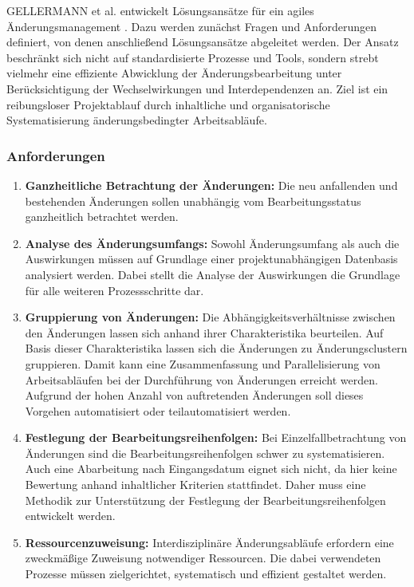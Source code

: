 GELLERMANN et al. entwickelt Lösungsansätze für ein agiles Änderungsmanagement \autocite{Gellermann2017}. Dazu werden zunächst Fragen und Anforderungen definiert, von denen anschließend Lösungsansätze abgeleitet werden. Der Ansatz beschränkt sich nicht auf standardisierte Prozesse und Tools, sondern strebt vielmehr eine effiziente Abwicklung der Änderungsbearbeitung unter Berücksichtigung der Wechselwirkungen und Interdependenzen an.  Ziel ist ein reibungsloser Projektablauf durch inhaltliche und organisatorische Systematisierung änderungsbedingter Arbeitsabläufe. 

\subsubsection*{Anforderungen}

\begin{enumerate}
 \item \textbf{Ganzheitliche Betrachtung der Änderungen: }
Die neu anfallenden und bestehenden Änderungen sollen unabhängig vom Bearbeitungsstatus ganzheitlich betrachtet werden.  
 \item \textbf{Analyse des Änderungsumfangs: }
 Sowohl Änderungsumfang als auch die Auswirkungen müssen auf Grundlage einer projektunabhängigen Datenbasis analysiert werden. Dabei stellt die Analyse der Auswirkungen die Grundlage für alle weiteren Prozessschritte dar. 
 \item \textbf{Gruppierung von Änderungen: }
  Die Abhängigkeitsverhältnisse zwischen den Änderungen lassen sich anhand ihrer Charakteristika beurteilen. Auf Basis dieser Charakteristika lassen sich die Änderungen zu Änderungsclustern gruppieren. Damit kann eine Zusammenfassung und Parallelisierung von Arbeitsabläufen bei der Durchführung von Änderungen erreicht werden. Aufgrund der hohen Anzahl von auftretenden Änderungen soll dieses Vorgehen automatisiert oder teilautomatisiert werden. 
 \item \textbf{Festlegung der Bearbeitungsreihenfolgen: }
 Bei Einzelfallbetrachtung von Änderungen sind die Bearbeitungsreihenfolgen schwer zu systematisieren. Auch eine Abarbeitung nach Eingangsdatum eignet sich nicht, da hier keine Bewertung anhand inhaltlicher Kriterien stattfindet. 
 Daher muss eine Methodik zur Unterstützung der Festlegung der Bearbeitungsreihenfolgen entwickelt werden. 
 \item \textbf{Ressourcenzuweisung: }
 Interdisziplinäre Änderungsabläufe erfordern eine zweckmäßige Zuweisung notwendiger Ressourcen. Die dabei verwendeten Prozesse müssen zielgerichtet, systematisch und effizient gestaltet werden. 

\end{enumerate}
